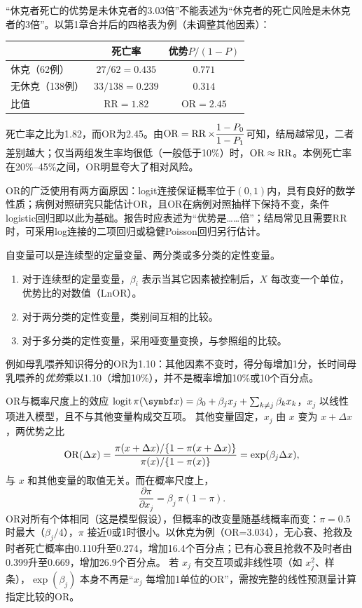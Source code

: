 \begin{sikao}[OR与RR的区别]
“休克者死亡的优势是未休克者的3.03倍”不能表述为“休克者的死亡风险是未休克者的3倍”。以第1章合并后的四格表为例（未调整其他因素）：
\begin{center}\small
\begin{tabular}{lcc}\toprule
&死亡率&优势$P/(1-P)$\\\midrule
休克（62例）&$27/62=0.435$&$0.771$\\
无休克（138例）&$33/138=0.239$&$0.314$\\\midrule
比值&RR$=1.82$&OR$=2.45$\\\bottomrule
\end{tabular}
\end{center}
死亡率之比为1.82，而OR为2.45。由$\operatorname{OR}=\operatorname{RR}\times\dfrac{1-P_0}{1-P_1}$可知，结局越常见，二者差别越大；仅当两组发生率均很低（一般低于10\%）时，$\operatorname{OR}\approx\operatorname{RR}$。本例死亡率在20\%--45\%之间，OR明显夸大了相对风险。

OR的广泛使用有两方面原因：logit连接保证概率位于$(0,1)$内，具有良好的数学性质；病例对照研究只能估计OR，且OR在病例对照抽样下保持不变，条件logistic回归即以此为基础。报告时应表述为“优势是……倍”；结局常见且需要RR时，可采用log连接的二项回归或稳健Poisson回归另行估计。
\end{sikao}
自变量可以是连续型的定量变量、两分类或多分类的定性变量。
\begin{enumerate}
\item 对于连续型的定量变量，$\beta_i$ 表示当其它因素被控制后，$X$ 每改变一个单位，优势比的对数值（LnOR）。
\item 对于两分类的定性变量，类别间互相的比较。
\item 对于多分类的定性变量，采用哑变量变换，与参照组的比较。
\end{enumerate}
\begin{annotation}例如母乳喂养知识得分的OR为1.10：其他因素不变时，得分每增加1分，长时间母乳喂养的\emph{优势}乘以1.10（增加10\%），并不是概率增加10\%或10个百分点。\end{annotation}
\begin{derivation}{OR与概率尺度上的效应}
$\logit\pi(\bm x)=\beta_0+\beta_jx_j+\sum_{k\ne j}\beta_kx_k$，$x_j$ 以线性项进入模型，且不与其他变量构成交互项。
其他变量固定，$x_j$ 由 $x$ 变为 $x+\Delta x$，两优势之比
\[
\operatorname{OR}(\Delta x)=\frac{\pi(x+\Delta x)/\{1-\pi(x+\Delta x)\}}{\pi(x)/\{1-\pi(x)\}}=\exp(\beta_j\Delta x),
\]
与 $x$ 和其他变量的取值无关。而在概率尺度上，
\[
\frac{\partial\pi}{\partial x_j}=\beta_j\,\pi(1-\pi).
\]
OR对所有个体相同（这是模型假设），但概率的改变量随基线概率而变：$\pi=0.5$ 时最大（$\beta_j/4$），$\pi$ 接近0或1时很小。以休克为例（OR=3.034），无心衰、抢救及时者死亡概率由0.110升至0.274，增加16.4个百分点；已有心衰且抢救不及时者由0.399升至0.669，增加26.9个百分点。
若 $x_j$ 有交互项或非线性项（如 $x_j^2$、样条），$\exp(\beta_j)$ 本身不再是“$x_j$ 每增加1单位的OR”，需按完整的线性预测量计算指定比较的OR。
\end{derivation}

